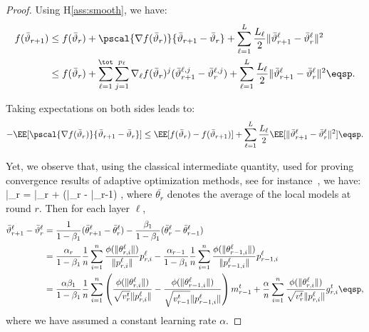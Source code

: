 \documentclass[twoside]{article}
\begin{document}

 \begin{proof}
 Using H\ref{ass:smooth}, we have:
 \begin{align}\notag
 f(\bar{\vartheta}_{r+1}) &  \leq f(\bar{\vartheta}_r) + \pscal{\nabla f(\bar{\vartheta}_r)}{\bar{\vartheta}_{r+1} - \bar{\vartheta}_r} + \sum_{\ell =1}^L \frac{L_\ell}{2} \| \bar{\vartheta}^\ell_{r+1} - \bar{\vartheta}^\ell_r \|^2\\\notag
 &  \leq f(\bar{\vartheta}_r) + \sum_{\ell=1}^\tot \sum_{j=1}^{p_\ell} \nabla_{\ell} f(\bar{\vartheta}_r)^j (\bar{\vartheta}^{\ell,j}_{r+1} - \bar{\vartheta}^{\ell,j}_r) + \sum_{\ell =1}^L \frac{L_\ell}{2} \| \bar{\vartheta}^\ell_{r+1} - \bar{\vartheta}^\ell_r \|^2  \eqsp.
 \end{align}

 Taking expectations on both sides leads to:
 \begin{align}\label{eq:main}
 - \EE[  \pscal{\nabla f(\bar{\vartheta}_r)}{\bar{\vartheta}_{r+1} - \bar{\vartheta}_r}]  \leq  \EE[ f(\bar{\vartheta}_r) - f(\bar{\vartheta}_{r+1})] + \sum_{\ell =1}^L \frac{L_\ell}{2} \EE[  \| \bar{\vartheta}^\ell_{r+1} - \bar{\vartheta}^\ell_r \|^2] \eqsp.
 \end{align}

 Yet, we observe that, using the classical intermediate quantity, used for proving convergence results of adaptive optimization methods, see for instance~\citep{RKK18}, we have:
 \beq\label{eq:defseq}
 \bar{\vartheta}_r = \bar{\theta}_r +  (\bar{\theta}_{r} - \bar{\theta}_{r-1}) \eqsp,
 \eeq
 where $\bar{\theta_r}$ denotes the average of the local models at round $r$.
 Then for each layer $\ell$,
 \begin{align}\label{eq:gap}
 \bar{\vartheta}^\ell_{r+1} - \bar{\vartheta}^\ell_r  & = \frac{1}{1-\beta_1}(\bar{\theta}^\ell_{r+1} - \bar{\theta}^\ell_{r}) - \frac{\beta_1}{1-\beta_1}(\bar{\theta}^\ell_{r} - \bar{\theta}^\ell_{r-1})\\
 & = \frac{\alpha_{r}}{1-\beta_1} \frac{1}{n} \sum_{i = 1}^n \frac{\phi(\|\theta_{r,i}^{\ell}\|)}{\|p_{r,i}^{\ell}\|} p_{r,i}^{\ell}  - \frac{\alpha_{r-1}}{1-\beta_1} \frac{1}{n} \sum_{i = 1}^n \frac{\phi(\|\theta_{r-1,i}^{\ell}\|)}{\|p_{r-1,i}^{\ell}\|} p_{r-1,i}^{\ell}\\
 & = \frac{\alpha \beta_1}{1-\beta_1} \frac{1}{n}  \sum_{i = 1}^n  \left( \frac{\phi(\|\theta_{r,i}^{\ell}\|)}{\sqrt{v^{t}_{r}} \|p_{r,i}^{\ell}\|} - \frac{\phi(\|\theta_{r-1,i}^{\ell}\|)}{\sqrt{v^{t}_{r-1}} \|p_{r-1,i}^{\ell}\|} \right) m^{t}_{r-1} + \frac{\alpha}{n} \sum_{i = 1}^n \frac{\phi(\|\theta_{r,i}^{\ell}\|)}{\sqrt{v^{t}_{r}} \|p_{r,i}^{\ell}\|} g^t_{r,i} \eqsp,
 \end{align}
 where we have assumed a constant learning rate $\alpha$.



\end{proof}
\end{document}
